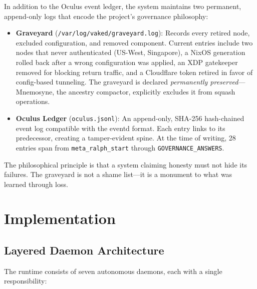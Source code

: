 \documentclass[conference]{IEEEtran}
\begin{document}
In addition to the Oculus event ledger, the system maintains two permanent,
append-only logs that encode the project's governance philosophy:

\begin{itemize}
\item \textbf{Graveyard} (\texttt{/var/log/vaked/graveyard.log}): Records every
retired node, excluded configuration, and removed component. Current entries
include two nodes that never authenticated (US-West, Singapore), a NixOS
generation rolled back after a wrong configuration was applied, an XDP
gatekeeper removed for blocking return traffic, and a Cloudflare token retired
in favor of config-based tunneling. The graveyard is declared
\textit{permanently preserved}---Mnemosyne, the ancestry compactor, explicitly
excludes it from squash operations.

\item \textbf{Oculus Ledger} (\texttt{oculus.jsonl}): An append-only,
SHA-256 hash-chained event log compatible with the eventd format. Each
entry links to its predecessor, creating a tamper-evident spine. At the
time of writing, 28 entries span from \texttt{meta\_ralph\_start} through
\texttt{GOVERNANCE\_ANSWERS}.
\end{itemize}

The philosophical principle is that a system claiming honesty must not hide
its failures. The graveyard is not a shame list---it is a monument to what
was learned through loss.

\section{Implementation}

\subsection{Layered Daemon Architecture}

The runtime consists of seven autonomous daemons, each with a single
responsibility:
\end{document}
